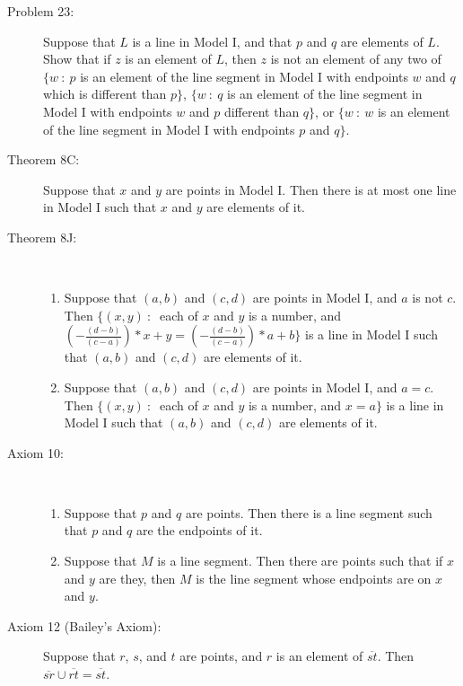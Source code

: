 \documentclass{article}
\begin{document}
\begin{description}
  \item[Problem 23:] Suppose that $L$ is a line in Model I, and that $p$ and $q$ are elements of $L$. Show that if $z$ is an element of $L$, then $z$ is not an element of any two of $\{ w\ :\ p$ is an element of the line segment in Model I with endpoints $w$ and $q$ which is different than $p \}$, $\{ w\ :\ q$ is an element of the line segment in Model I with endpoints $w$ and $p$ different than $q \}$, or $\{ w\ :\ w$ is an element of the line segment in Model I with endpoints $p$ and $q \}$.

  \item[Theorem 8C:] Suppose that $x$ and $y$ are points in Model I. Then there is at most one line in Model I such that $x$ and $y$ are elements of it.

  \item[Theorem 8J:] $\ $
    \begin{enumerate}[\hspace{1cm}(i.)]
      \item Suppose that $(a,b)$ and $(c,d)$ are points in Model I, and $a$ is not $c$. Then $\{ (x,y)\ :\ $ each of $x$ and $y$ is a number, and $\left( -\frac{(d-b)}{(c-a)} \right) * x + y = \left( -\frac{(d-b)}{(c-a)} \right) * a + b \}$ is a line in Model I such that $(a,b)$ and $(c,d)$ are elements of it.
      \item Suppose that $(a,b)$ and $(c,d)$ are points in Model I, and $a = c$. Then $\{ (x,y)\ :\ $ each of $x$ and $y$ is a number, and $x = a \}$ is a line in Model I such that $(a,b)$ and $(c,d)$ are elements of it.
    \end{enumerate}

  \item[Axiom 10:] $\ $
    \begin{enumerate}[\hspace{1cm}(i.)]
      \item Suppose that $p$ and $q$ are points. Then there is a line segment such that $p$ and $q$ are the endpoints of it.
      \item Suppose that $M$ is a line segment. Then there are points such that if $x$ and $y$ are they, then $M$ is the line segment whose endpoints are on $x$ and $y$.
    \end{enumerate}

  \item[Axiom 12 (Bailey's Axiom):] Suppose that $r$, $s$, and $t$ are points, and $r$ is an element of $\overline{st}$. Then $\overline{sr} \cup \overline{rt} = \overline{st}$.


\end{description}
\end{document}
